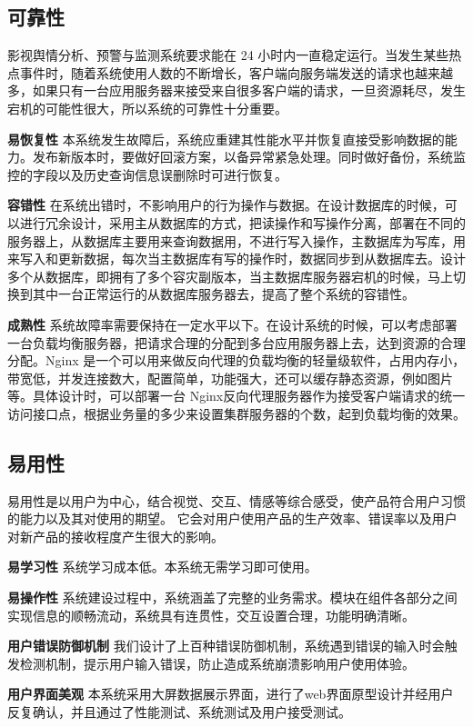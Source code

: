 \subsection{可靠性}
影视舆情分析、预警与监测系统要求能在 24 小时内一直稳定运行。当发生某些热点事件时，随着系统使用人数的不断增长，客户端向服务端发送的请求也越来越多，如果只有一台应用服务器来接受来自很多客户端的请求，一旦资源耗尽，发生宕机的可能性很大，所以系统的可靠性十分重要。

\textbf{易恢复性}
本系统发生故障后，系统应重建其性能水平并恢复直接受影响数据的能力。发布新版本时，要做好回滚方案，以备异常紧急处理。同时做好备份，系统监控的字段以及历史查询信息误删除时可进行恢复。

\textbf{容错性}
在系统出错时，不影响用户的行为操作与数据。在设计数据库的时候，可以进行冗余设计，采用主从数据库的方式，把读操作和写操作分离，部署在不同的服务器上，从数据库主要用来查询数据用，不进行写入操作，主数据库为写库，用来写入和更新数据，每次当主数据库有写的操作时，数据同步到从数据库去。设计多个从数据库，即拥有了多个容灾副版本，当主数据库服务器宕机的时候，马上切换到其中一台正常运行的从数据库服务器去，提高了整个系统的容错性。

\textbf{成熟性}
系统故障率需要保持在一定水平以下。在设计系统的时候，可以考虑部署一台负载均衡服务器，把请求合理的分配到多台应用服务器上去，达到资源的合理分配。Nginx 是一个可以用来做反向代理的负载均衡的轻量级软件，占用内存小，带宽低，并发连接数大，配置简单，功能强大，还可以缓存静态资源，例如图片等。具体设计时，可以部署一台 Nginx反向代理服务器作为接受客户端请求的统一访问接口点，根据业务量的多少来设置集群服务器的个数，起到负载均衡的效果。

\subsection{易用性}
易用性是以用户为中心，结合视觉、交互、情感等综合感受，使产品符合用户习惯的能力以及其对使用的期望。 它会对用户使用产品的生产效率、错误率以及用户对新产品的接收程度产生很大的影响。

\textbf{易学习性}
系统学习成本低。本系统无需学习即可使用。

\textbf{易操作性}
系统建设过程中，系统涵盖了完整的业务需求。模块在组件各部分之间实现信息的顺畅流动，系统具有连贯性，交互设置合理，功能明确清晰。

\textbf{用户错误防御机制}
我们设计了上百种错误防御机制，系统遇到错误的输入时会触发检测机制，提示用户输入错误，防止造成系统崩溃影响用户使用体验。

\textbf{用户界面美观}
本系统采用大屏数据展示界面，进行了web界面原型设计并经用户反复确认，并且通过了性能测试、系统测试及用户接受测试。

